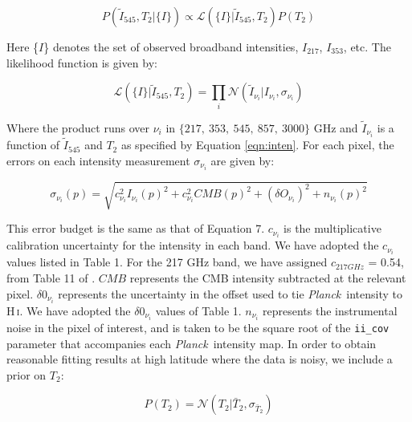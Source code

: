 \documentclass{emulateapj}
\newcommand{\PLANCK}{{\it Planck}}
\begin{document}
\begin{equation}
\label{eqn:post}
P(\tilde{I}_{545}, T_2|\{I\}) \propto \mathcal{L}(\{I\}|\tilde{I}_{545}, T_2)P(T_2)
\end{equation}

Here \{$I$\} denotes the set of observed broadband intensities, $I_{217}$, 
$I_{353}$, etc. The likelihood function is given by:

\begin{equation}
\mathcal{L}(\{I\}|\tilde{I}_{545}, T_2) = \displaystyle\prod\limits_{i}\mathcal{N}(\tilde{I}_{\nu_{i}}|I_{\nu_{i}}, \sigma_{\nu_i})
\end{equation}


Where the product runs over $\nu_i$ in $\{217,\ 353,\ 545,\ 857,\ 3000\}$ GHz
and $\tilde{I}_{\nu_i}$ is a function of $\tilde{I}_{545}$ and $T_2$ as 
specified by Equation \ref{eqn:inten}. For each pixel, the errors on each 
intensity measurement $\sigma_{\nu_i}$ are given by:

\begin{equation}
\sigma_{\nu_i}(p) = \sqrt{c^2_{\nu_i}I_{\nu_i}(p)^2 + c^2_{\nu_i}CMB(p)^2 + (\delta O_{\nu_i})^2 + n_{\nu_i}(p)^2}
\end{equation}


This error budget is the same as that of \cite{planckdust} Equation 7. 
$c_{\nu_i}$ is the multiplicative calibration uncertainty for the intensity in 
each band. We have adopted the $c_{\nu_i}$ values listed in \cite{planckdust} 
Table 1. For the 217 GHz band, we have assigned $c_{217 GHz}$ = 0.54, from 
Table 11 of \cite{planckcalib}. $CMB$ represents the CMB intensity 
subtracted at the relevant pixel. $\delta0_{\nu_i}$ represents the uncertainty
in the offset used to tie \PLANCK~intensity to H\,\textsc{i}. We have adopted 
the  $\delta0_{\nu_i}$ values of \cite{planckdust} Table 1. $n_{\nu_i}$ 
represents the instrumental noise in the pixel of interest, and is taken to be 
the square root of the \verb|ii_cov| parameter that accompanies each 
\PLANCK~intensity map. In order to obtain reasonable fitting results at high 
latitude where the data is noisy, we include a prior on $T_2$:


\begin{equation}
P(T_2) = \mathcal{N}(T_2|\bar{T}_2, \sigma_{\bar{T}_2})
\end{equation}
\end{document}
